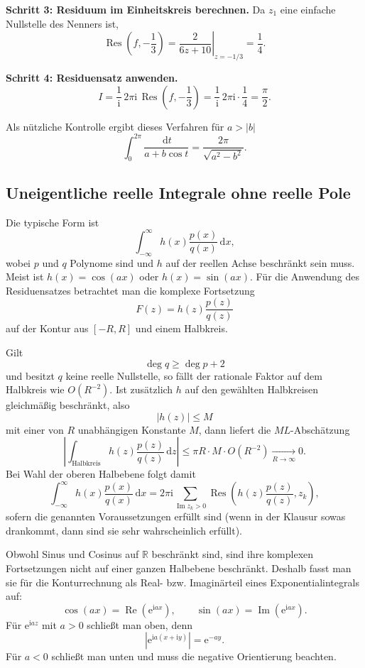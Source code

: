 \documentclass[11pt,a4paper]{article}
\newcommand{\R}{\mathbb R}
\newcommand{\ii}{\mathrm i}
\newcommand{\ee}{\mathrm e}
\newcommand{\dd}{\,\mathrm d}
\newcommand{\Res}{\operatorname{Res}}
\newcommand{\Ree}{\operatorname{Re}}
\newcommand{\Imm}{\operatorname{Im}}
\newcommand{\1}{\mathbf 1}
\begin{document}
{\begin{beispielbox}[title={Vorgerechnetes Prüfungsbeispiel: Aufgabe 9 (2024) -- trigonometrisches Integral}]
\textbf{Schritt 3: Residuum im Einheitskreis berechnen.}
Da $z_1$ eine einfache Nullstelle des Nenners ist,
\[
\Res\!\left(f,-\frac13\right)
=\left.\frac{2}{6z+10}\right|_{z=-1/3}
=\frac14.
\]

\textbf{Schritt 4: Residuensatz anwenden.}
\[
I
=\frac1{\ii}\,2\pi\ii\,
\Res\!\left(f,-\frac13\right)
=\frac1{\ii}\,2\pi\ii\cdot\frac14
=\boxed{\frac{\pi}{2}}.
\]
\end{beispielbox}

Als nützliche Kontrolle ergibt dieses Verfahren für $a>|b|$
\[
\int_0^{2\pi}\frac{\dd t}{a+b\cos t}
=\frac{2\pi}{\sqrt{a^2-b^2}}.
\]

\subsection{Uneigentliche reelle Integrale ohne reelle Pole}
Die typische Form ist
\[
\int_{-\infty}^{\infty}
h(x)\frac{p(x)}{q(x)}\dd x,
\]
wobei $p$ und $q$ Polynome sind und $h$ auf der reellen Achse beschränkt sein
muss. Meist ist $h(x)=\cos(ax)$ oder $h(x)=\sin(ax)$. Für die Anwendung des
Residuensatzes betrachtet man die komplexe Fortsetzung
\[
F(z)=h(z)\frac{p(z)}{q(z)}
\]
auf der Kontur aus $[-R,R]$ und einem Halbkreis.

Gilt
\[
\deg q\ge\deg p+2
\]
und besitzt $q$ keine reelle Nullstelle, so fällt der rationale Faktor auf dem
Halbkreis wie $O(R^{-2})$. Ist zusätzlich $h$ auf den gewählten Halbkreisen
gleichmäßig beschränkt, also
\[
|h(z)|\leq M
\]
mit einer von $R$ unabhängigen Konstante $M$, dann liefert die
$ML$-Abschätzung
\[
\left|\int_{\text{Halbkreis}}
h(z)\frac{p(z)}{q(z)}\dd z\right|
\leq \pi R\cdot M\cdot O(R^{-2})
\xrightarrow[R\to\infty]{}0.
\]
Bei Wahl der oberen Halbebene folgt damit
\[
\int_{-\infty}^{\infty}
h(x)\frac{p(x)}{q(x)}\dd x
=2\pi\ii\sum_{\Imm z_k>0}
\Res\!\left(h(z)\frac{p(z)}{q(z)},z_k\right),
\]
sofern die genannten Voraussetzungen erfüllt sind (wenn in der Klausur sowas drankommt, dann sind sie sehr wahrscheinlich erfüllt).

Obwohl Sinus und Cosinus auf $\R$ beschränkt sind, sind ihre komplexen
Fortsetzungen nicht auf einer ganzen Halbebene beschränkt. Deshalb fasst man sie
für die Konturrechnung als Real- bzw. Imaginärteil eines Exponentialintegrals auf:
\[
\cos(ax)=\Ree(\ee^{\ii ax}),\qquad
\sin(ax)=\Imm(\ee^{\ii ax}).
\]
Für $\ee^{\ii az}$ mit $a>0$ schließt man oben, denn
\[
|\ee^{\ii a(x+\ii y)}|=\ee^{-ay}.
\]
Für $a<0$ schließt man unten und muss die negative Orientierung beachten.

}
\end{document}
